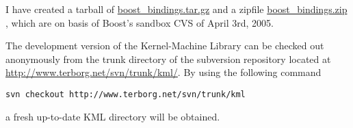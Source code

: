 \documentclass{article}
\begin{document}
I have created a tarball of 
\href{research/kml/boost\_bindings.tar.gz}{boost\_bindings.tar.gz}
 and a zipfile 
\href{research/kml/boost\_bindings.zip}{boost\_bindings.zip}%
, which are on basis of Boost's sandbox CVS of April 3rd, 2005.


The development version of the Kernel-Machine Library can be checked out anonymously from 
the trunk directory of the subversion repository located at 
\href{http://www.terborg.net/svn/trunk/kml/}{http://www.terborg.net/svn/trunk/kml/}. By using the following command
\begin{verbatim}
svn checkout http://www.terborg.net/svn/trunk/kml
\end{verbatim}
a fresh up-to-date KML directory will be obtained. 




\end{document}
